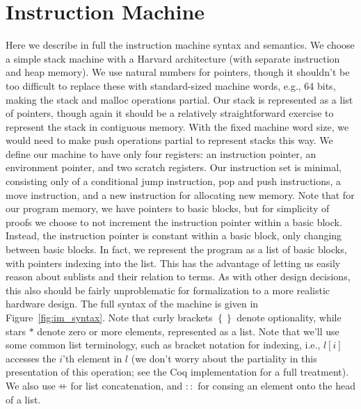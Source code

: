 \section{Instruction Machine} \label{sec:im_semantics}

Here we describe in full the instruction machine syntax and semantics. We
choose a simple stack machine with a Harvard architecture (with separate
instruction and heap memory). We use natural numbers for pointers, though it
shouldn't be too difficult to replace these with standard-sized machine words,
e.g., 64 bits, making the stack and malloc operations partial. Our stack is
represented as a list of pointers, though again it should be a relatively
straightforward exercise to represent the stack in contiguous memory. With the fixed
machine word size, we would need to make push operations partial to represent
stacks this way. We define our machine to have only four registers: an
instruction pointer, an environment pointer, and two scratch registers. Our
instruction set is minimal, consisting only of a conditional jump instruction,
pop and push instructions, a move instruction, and a new instruction for
allocating new memory. Note that for our program memory, we have pointers to
basic blocks, but for simplicity of proofs we choose to not increment the
instruction pointer within a basic block.  Instead, the instruction pointer is
constant within a basic block, only changing between basic blocks. In fact, we
represent the program as a list of basic blocks, with pointers indexing into the
list. This has the advantage of letting us easily reason about sublists and
their relation to terms. As with other design decisions, this also should be
fairly unproblematic for formalization to a more realistic hardware design. The
full syntax of the machine is given in Figure~\ref{fig:im_syntax}. Note that
curly brackets $\left\{\right\}$ denote optionality, while stars $*$ denote zero
or more elements, represented as a list. Note that we'll use some common list
terminology, such as bracket notation for indexing, i.e., $l\left[i\right]$ accesses the
$i$'th element in $l$ (we don't worry about the partiality in this presentation
of this operation; see the Coq implementation for a full treatment). We also use
$\concat$ for list concatenation, and $::$ for consing an element onto the head
of a list. 

